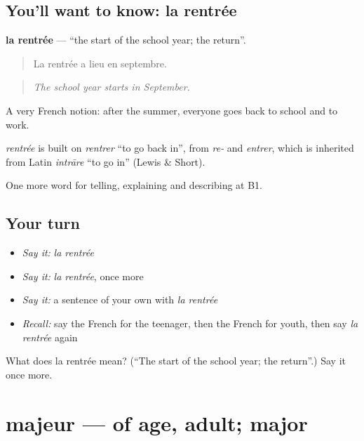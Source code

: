 \subsection*{You'll want to know: la rentrée}
\textbf{la rentrée} — \textquotedblleft{}the start of the school year; the return\textquotedblright{}.

\begin{quote}
La rentrée a lieu en septembre.
\end{quote}

\begin{quote}
\emph{The school year starts in September.}
\end{quote}

A very French notion: after the summer, everyone goes back to school and to work.

\begin{cousinweb}
\emph{rentrée} is built on \emph{rentrer} \textquotedblleft{}to go back in\textquotedblright{}, from \emph{re-} and \emph{entrer}, which is inherited from Latin \emph{intrāre} \textquotedblleft{}to go in\textquotedblright{} (Lewis \& Short).
\end{cousinweb}

\begin{grammarlens}[title={What you've built}]
One more word for telling, explaining and describing at B1.
\end{grammarlens}

\subsection*{Your turn}
\begin{itemize}
\raggedright
  \item \emph{Say it:} \emph{la rentrée}
  \item \emph{Say it:} \emph{la rentrée}, once more
  \item \emph{Say it:} a sentence of your own with \emph{la rentrée}
  \item \emph{Recall:} say the French for the teenager, then the French for youth, then say \emph{la rentrée} again
\end{itemize}

\begin{tcolorbox}[breakable,colback=teal!4,colframe=teal!35!black,title={Before you move on}]
What does la rentrée mean? (\textquotedblleft{}The start of the school year; the return\textquotedblright{}.) Say it once more.
\end{tcolorbox}
\section[majeur]{majeur — of age, adult; major}

